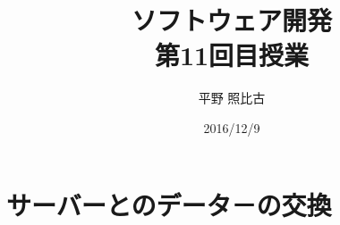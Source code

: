 
\title{ソフトウェア開発\\第11回目授業}
\author{平野 照比古}
\institute{}
\date{2016/12/9}
\newtheorem{Prob}{解説}
\newcommand{\Elm}[1]{\texttt{<#1>}}

\newcommand{\DOMM}{\texttt}
\newcommand{\Event}{\texttt}
\newcommand{\DOMP}{\texttt}
\newcommand{\DOM}{\texttt{DOM}}
\newcommand{\keyitem}{\relax}
\newcommand{\HTML}{HTML文書}

\frame{\maketitle}
\section{サーバーとのデータ－の交換}
